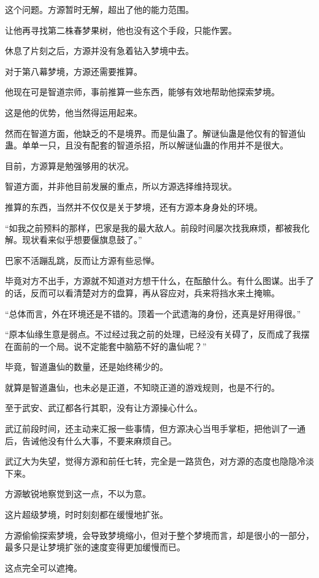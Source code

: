 \begin{this_body}
这个问题。方源暂时无解，超出了他的能力范围。

让他再寻找第二株春梦果树，他也没有这个手段，只能作罢。

休息了片刻之后，方源并没有急着钻入梦境中去。

对于第八幕梦境，方源还需要推算。

他现在可是智道宗师，事前推算一些东西，能够有效地帮助他探索梦境。

这是他的优势，他当然得运用起来。

然而在智道方面，他缺乏的不是境界。而是仙蛊了。解谜仙蛊是他仅有的智道仙蛊。单单一只，且没有配套的智道杀招，所以解谜仙蛊的作用并不是很大。

目前，方源算是勉强够用的状况。

智道方面，并非他目前发展的重点，所以方源选择维持现状。

推算的东西，当然并不仅仅是关于梦境，还有方源本身身处的环境。

“如我之前预料的那样，巴家是我的最大敌人。前段时间屡次找我麻烦，都被我化解。现状看来似乎想要偃旗息鼓了。”

巴家不活蹦乱跳，反而让方源有些忌惮。

毕竟对方不出手，方源就不知道对方想干什么，在酝酿什么。有什么图谋。出手了的话，反而可以看清楚对方的盘算，再从容应对，兵来将挡水来土掩嘛。

“总体而言，外在环境还是不错的。顶着一个武遗海的身份，还真是好用得很。”

“原本仙缘生意是弱点。不过经过我之前的处理，已经没有关碍了，反而成了我摆在面前的一个局。说不定能套中脑筋不好的蛊仙呢？”

毕竟，智道蛊仙的数量，还是始终稀少的。

就算是智道蛊仙，也未必是正道，不知晓正道的游戏规则，也是不行的。

至于武安、武辽都各行其职，没有让方源操心什么。

武辽前段时间，还主动来汇报一些事情，但方源决心当甩手掌柜，把他训了一通后，告诫他没有什么大事，不要来麻烦自己。

武辽大为失望，觉得方源和前任七转，完全是一路货色，对方源的态度也隐隐冷淡下来。

方源敏锐地察觉到这一点，不以为意。

这片超级梦境，时时刻刻都在缓慢地扩张。

方源偷偷探索梦境，会导致梦境缩小，但对于整个梦境而言，却是很小的一部分，最多只是让梦境扩张的速度变得更加缓慢而已。

这点完全可以遮掩。


\end{this_body}
